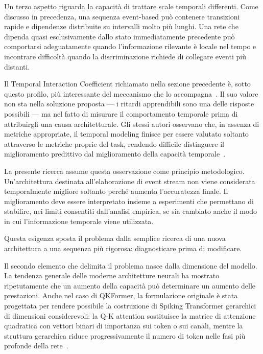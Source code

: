 Un terzo aspetto riguarda la capacità di trattare scale temporali differenti. Come discusso in precedenza, una sequenza event-based può contenere transizioni rapide e dipendenze distribuite su intervalli molto più lunghi. Una rete che dipenda quasi esclusivamente dallo stato immediatamente precedente può comportarsi adeguatamente quando l'informazione rilevante è locale nel tempo e incontrare difficoltà quando la discriminazione richiede di collegare eventi più distanti.

Il Temporal Interaction Coefficient richiamato nella sezione precedente è, sotto questo profilo, più interessante del meccanismo che lo accompagna~\cite{shi2026multidelay}. Il suo valore non sta nella soluzione proposta --- i ritardi apprendibili sono una delle risposte possibili --- ma nel fatto di misurare il comportamento temporale prima di attribuirgli una causa architetturale. Gli stessi autori osservano che, in assenza di metriche appropriate, il temporal modeling finisce per essere valutato soltanto attraverso le metriche proprie del task, rendendo difficile distinguere il miglioramento predittivo dal miglioramento della capacità temporale~\cite{shi2026multidelay}.

La presente ricerca assume questa osservazione come principio metodologico. Un'architettura destinata all'elaborazione di event stream non viene considerata temporalmente migliore soltanto perché aumenta l'accuratezza finale. Il miglioramento deve essere interpretato insieme a esperimenti che permettano di stabilire, nei limiti consentiti dall'analisi empirica, se sia cambiato anche il modo in cui l'informazione temporale viene utilizzata.

Questa esigenza sposta il problema dalla semplice ricerca di una nuova architettura a una sequenza più rigorosa: diagnosticare prima di modificare.

Il secondo elemento che delimita il problema nasce dalla dimensione del modello. La tendenza generale delle moderne architetture neurali ha mostrato ripetutamente che un aumento della capacità può determinare un aumento delle prestazioni. Anche nel caso di QKFormer, la formulazione originale è stata progettata per rendere possibile la costruzione di Spiking Transformer gerarchici di dimensioni considerevoli: la Q-K attention sostituisce la matrice di attenzione quadratica con vettori binari di importanza sui token o sui canali, mentre la struttura gerarchica riduce progressivamente il numero di token nelle fasi più profonde della rete~\cite{zhou2024qkformer}.

